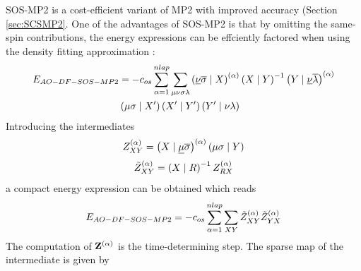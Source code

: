 SOS-MP2 is a cost-efficient variant of MP2 with improved  accuracy (Section \ref{sec:SCSMP2}. One of the advantages of SOS-MP2 is that by omitting the same-spin contributions, the energy expressions can be effciently factored when using the density fitting approximation \cite{Mau2014,Gla2020}: 
\begin{equation}
\begin{split}
E_{AO-DF-SOS-MP2} &= - c_{os} \sum^{nlap}_{\alpha=1} \sum_{\mu\nu\sigma\lambda} \left( \underline{\nu}\overline{\sigma} \mid X \right)^{(\alpha)} \left( X \mid Y \right)^{-1} \left( Y \mid \underline{\nu}\overline{\lambda} \right)^{(\alpha)} \\
& \left( \mu\sigma \mid X' \right) \left( X' \mid Y' \right) \left( Y' \mid \nu\lambda \right)
\end{split}
\end{equation}
\noindent Introducing the intermediates
\begin{equation}
Z^{(\alpha)}_{XY} = \left( X \mid \underline{\mu}\overline{\sigma} \right)^{(\alpha)} \left( \mu\sigma \mid Y \right)
\end{equation}
\begin{equation}
\tilde{Z}^{(\alpha)}_{XY} = \left( X \mid R \right)^{-1} Z^{(\alpha)}_{RX}
\end{equation}
\noindent a compact energy expression can be obtained which reads
\begin{equation}
E_{AO-DF-SOS-MP2} = - c_{os} \sum^{nlap}_{\alpha=1} \sum_{XY} \tilde{Z}^{(\alpha)}_{XY} \tilde{Z}^{(\alpha)}_{YX} 
\end{equation}
\noindent The computation of $\mathbf{Z}^{(\alpha)}$ is the time-determining step. The sparse map of the intermediate is given by 
\begin{center}
\end{center}
